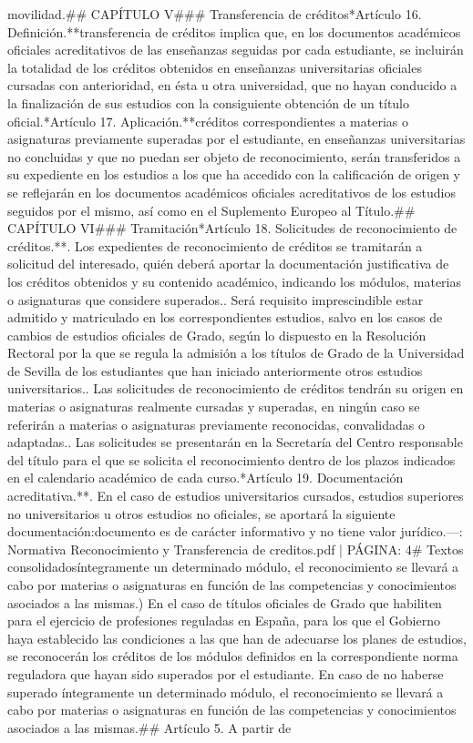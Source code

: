 \documentclass{article}
\begin{document}
\begin{itemize}
{{{{movilidad.\n\n## CAPÍTULO V\n### Transferencia de créditos\n**Artículo 16. Definición.**\nLa transferencia de créditos implica que, en los documentos académicos oficiales acreditativos de las enseñanzas seguidas por cada estudiante, se incluirán la totalidad de los créditos obtenidos en enseñanzas universitarias oficiales cursadas con anterioridad, en ésta u otra universidad, que no hayan conducido a la finalización de sus estudios con la consiguiente obtención de un título oficial.\n\n**Artículo 17. Aplicación.**\nLos créditos correspondientes a materias o asignaturas previamente superadas por el estudiante, en enseñanzas universitarias no concluidas y que no puedan ser objeto de reconocimiento, serán transferidos a su expediente en los estudios a los que ha accedido con la calificación de origen y se reflejarán en los documentos académicos oficiales acreditativos de los estudios seguidos por el mismo, así como en el Suplemento Europeo al Título.\n\n## CAPÍTULO VI\n### Tramitación\n**Artículo 18. Solicitudes de reconocimiento de créditos.**. Los expedientes de reconocimiento de créditos se tramitarán a solicitud del interesado, quién deberá aportar la documentación justificativa de los créditos obtenidos y su contenido académico, indicando los módulos, materias o asignaturas que considere superados.. Será requisito imprescindible estar admitido y matriculado en los correspondientes estudios, salvo en los casos de cambios de estudios oficiales de Grado, según lo dispuesto en la Resolución Rectoral por la que se regula la admisión a los títulos de Grado de la Universidad de Sevilla de los estudiantes que han iniciado anteriormente otros estudios universitarios.. Las solicitudes de reconocimiento de créditos tendrán su origen en materias o asignaturas realmente cursadas y superadas, en ningún caso se referirán a materias o asignaturas previamente reconocidas, convalidadas o adaptadas.. Las solicitudes se presentarán en la Secretaría del Centro responsable del título para el que se solicita el reconocimiento dentro de los plazos indicados en el calendario académico de cada curso.\n\n**Artículo 19. Documentación acreditativa.**. En el caso de estudios universitarios cursados, estudios superiores no universitarios u otros estudios no oficiales, se aportará la siguiente documentación:\n\nEste documento es de carácter informativo y no tiene valor jurídico.\n\n---\n\nFUENTE: Normativa Reconocimiento y Transferencia de creditos.pdf | PÁGINA: 4\n# Textos consolidados\n\nsuperado íntegramente un determinado módulo, el reconocimiento se llevará a cabo por materias o asignaturas en función de las competencias y conocimientos asociados a las mismas.\n{}) En el caso de títulos oficiales de Grado que habiliten para el ejercicio de profesiones reguladas en España, para los que el Gobierno haya establecido las condiciones a las que han de adecuarse los planes de estudios, se reconocerán los créditos de los módulos definidos en la correspondiente norma reguladora que hayan sido superados por el estudiante. En caso de no haberse superado íntegramente un determinado módulo, el reconocimiento se llevará a cabo por materias o asignaturas en función de las competencias y conocimientos asociados a las mismas.\n\n## Artículo 5. A partir de }}}}
\end{itemize}
\end{document}
